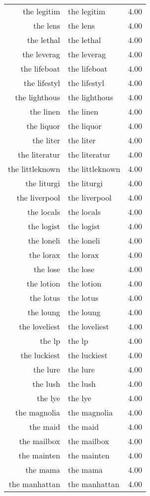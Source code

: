 \begin{table}[ht]
\begin{tabular}{rlr}
  the legitim & the legitim & 4.00 \\ 
  the lens & the lens & 4.00 \\ 
  the lethal & the lethal & 4.00 \\ 
  the leverag & the leverag & 4.00 \\ 
  the lifeboat & the lifeboat & 4.00 \\ 
  the lifestyl & the lifestyl & 4.00 \\ 
  the lighthous & the lighthous & 4.00 \\ 
  the linen & the linen & 4.00 \\ 
  the liquor & the liquor & 4.00 \\ 
  the liter & the liter & 4.00 \\ 
  the literatur & the literatur & 4.00 \\ 
  the littleknown & the littleknown & 4.00 \\ 
  the liturgi & the liturgi & 4.00 \\ 
  the liverpool & the liverpool & 4.00 \\ 
  the locals & the locals & 4.00 \\ 
  the logist & the logist & 4.00 \\ 
  the loneli & the loneli & 4.00 \\ 
  the lorax & the lorax & 4.00 \\ 
  the lose & the lose & 4.00 \\ 
  the lotion & the lotion & 4.00 \\ 
  the lotus & the lotus & 4.00 \\ 
  the loung & the loung & 4.00 \\ 
  the loveliest & the loveliest & 4.00 \\ 
  the lp & the lp & 4.00 \\ 
  the luckiest & the luckiest & 4.00 \\ 
  the lure & the lure & 4.00 \\ 
  the lush & the lush & 4.00 \\ 
  the lye & the lye & 4.00 \\ 
  the magnolia & the magnolia & 4.00 \\ 
  the maid & the maid & 4.00 \\ 
  the mailbox & the mailbox & 4.00 \\ 
  the mainten & the mainten & 4.00 \\ 
  the mama & the mama & 4.00 \\ 
  the manhattan & the manhattan & 4.00 \\ 

\end{tabular}
\end{table}
